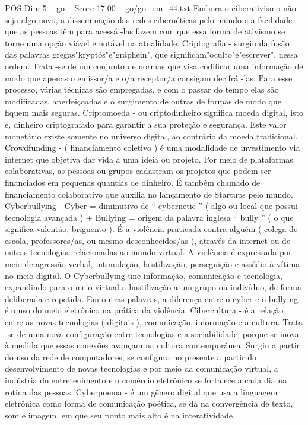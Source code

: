 \begin{textsample}{POS Dim 5 – go – Score 17.00 – go/go\_em\_44.txt}
Embora o ciberativismo não seja algo novo, a disseminação das redes cibernéticas pelo mundo e a facilidade que as pessoas têm para acessá -las fazem com que essa forma de ativismo se torne uma opção viável e notável na atualidade.
Criptografia - surgiu da fusão das palavras gregas"kryptós"e"gráphein", que significam"oculto"e"escrever", nessa ordem.
Trata -se de um conjunto de normas que visa codificar uma informação de modo que apenas o emissor/a e o/a receptor/a consigam decifrá -las.
Para esse processo, várias técnicas são empregadas, e com o passar do tempo elas são modificadas, aperfeiçoadas e o surgimento de outras de formas de modo que fiquem mais seguras.
Criptomoeda - ou criptodinheiro significa moeda digital, isto é, dinheiro criptografado para garantir a sua proteção e segurança.
Este valor monetário existe somente no universo digital, ao contrário da moeda tradicional.
Crowdfunding - ( financiamento coletivo ) é uma modalidade de investimento via internet que objetiva dar vida à uma ideia ou projeto.
Por meio de plataformas colaborativas, as pessoas ou grupos cadastram os projetos que podem ser financiados em pequenas quantias de dinheiro.
É também chamado de financiamento colaborativo que auxilia no lançamento de Startups pelo mundo.
Cyberbullying - Cyber = diminutivo de “ cybernetic ” ( algo ou local que possui tecnologia avançada ) + Bullying = origem da palavra inglesa “ bully ” ( o que significa valentão, briguento ).
É a violência praticada contra alguém ( colega de escola, professores/as, ou mesmo desconhecidos/as ), através da internet ou de outras tecnologias relacionadas ao mundo virtual.
A violência é expressada por meio de agressão verbal, intimidação, hostilização, perseguição e assédio à vítima no meio digital.
O Cyberbullying une informação, comunicação e tecnologia, expandindo para o meio virtual a hostilização a um grupo ou indivíduo, de forma deliberada e repetida.
Em outras palavras, a diferença entre o cyber e o bullying é o uso do meio eletrônico na prática da violência.
Cibercultura - é a relação entre as novas tecnologias ( digitais ), comunicação, informação e a cultura.
Trata -se de uma nova configuração entre tecnologias e a sociabilidade, porque se inova à medida que essas conexões avançam na cultura contemporânea.
Surgiu a partir do uso da rede de computadores, se configura no presente a partir do desenvolvimento de novas tecnologias e por meio da comunicação virtual, a indústria do entretenimento e o comércio eletrônico se fortalece a cada dia na rotina das pessoas.
Cyberpoema - é um gênero digital que usa a linguagem eletrônica como forma de comunicação poética, se dá na convergência de texto, som e imagem, em que seu ponto mais alto é na interatividade.

\end{textsample}
